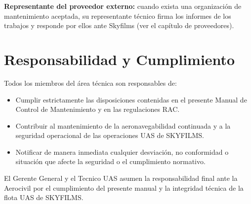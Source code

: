 \textbf{Representante del proveedor externo:} cuando exista una organización de mantenimiento aceptada, su representante técnico firma los informes de los trabajos y responde por ellos ante Skyfilms (ver el capítulo de proveedores).

\section{Responsabilidad y Cumplimiento}
Todos los miembros del área técnica son responsables de:

\begin{itemize}
    \item Cumplir estrictamente las disposiciones contenidas en el presente Manual de Control de Mantenimiento y en las regulaciones RAC.
    \item Contribuir al mantenimiento de la aeronavegabilidad continuada y a la seguridad operacional de las operaciones UAS de SKYFILMS.
    \item Notificar de manera inmediata cualquier desviación, no conformidad o situación que afecte la seguridad o el cumplimiento normativo.
\end{itemize}

El Gerente General y el Tecnico UAS asumen la responsabilidad final ante la Aerocivil por el cumplimiento del presente manual y la integridad técnica de la flota UAS de SKYFILMS.